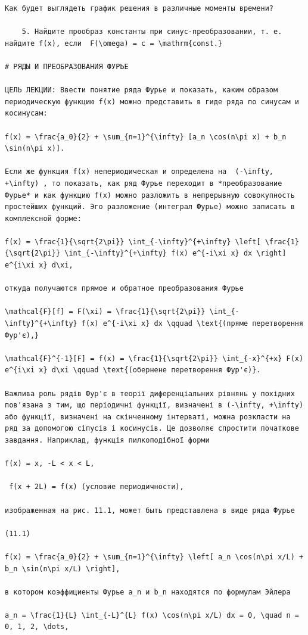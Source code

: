 \documentclass[
  ukrainian,
]{article}
\begin{document}
\begin{verbatim}
Как будет выглядеть график решения в различные моменты времени?

    5. Найдите прообраз константы при синус-преобразовании, т. е. найдите f(x), если  F(\omega) = c = \mathrm{const.}

# РЯДЫ И ПРЕОБРАЗОВАНИЯ ФУРЬЕ

ЦЕЛЬ ЛЕКЦИИ: Ввести понятие ряда Фурье и показать, каким образом периодическую функцию f(x) можно представить в гиде ряда по синусам и косинусам:

f(x) = \frac{a_0}{2} + \sum_{n=1}^{\infty} [a_n \cos(n\pi x) + b_n \sin(n\pi x)].

Если же функция f(x) непериодическая и определена на  (-\infty, +\infty) , то показать, как ряд Фурье переходит в *преобразование Фурье* и как функцию f(x) можно разложить в непрерывную совокупность простейших функций. Эго разложение (интеграл Фурье) можно записать в комплексной форме:

f(x) = \frac{1}{\sqrt{2\pi}} \int_{-\infty}^{+\infty} \left[ \frac{1}{\sqrt{2\pi}} \int_{-\infty}^{+\infty} f(x) e^{-i\xi x} dx \right] e^{i\xi x} d\xi,

откуда получаются прямое и обратное преобразования Фурье

\mathcal{F}[f] = F(\xi) = \frac{1}{\sqrt{2\pi}} \int_{-\infty}^{+\infty} f(x) e^{-i\xi x} dx \qquad \text{(пряме перетворення Фур'є),}

\mathcal{F}^{-1}[F] = f(x) = \frac{1}{\sqrt{2\pi}} \int_{-x}^{+x} F(x) e^{i\xi x} d\xi \qquad \text{(обернене перетворення Фур'є)}.

Важлива роль рядів Фур'є в теорії диференціальних рівнянь у похідних пов'язана з тим, що періодичні функції, визначені в (-\infty, +\infty) або функції, визначені на скінченному інтерваті, можна розкласти на ряд за допомогою сіпусів і косинусів. Це дозволяє спростити початкове завдання. Наприклад, функція пилкоподібної форми

f(x) = x, -L < x < L,

 f(x + 2L) = f(x) (условие периодичности),

изображенная на рис. 11.1, может быть представлена в виде ряда Фурье

(11.1)

f(x) = \frac{a_0}{2} + \sum_{n=1}^{\infty} \left[ a_n \cos(n\pi x/L) + b_n \sin(n\pi x/L) \right],

в котором коэффициенты Фурье a_n и b_n находятся по формулам Эйлера

a_n = \frac{1}{L} \int_{-L}^{L} f(x) \cos(n\pi x/L) dx = 0, \quad n = 0, 1, 2, \dots,


\end{verbatim}
\end{document}
